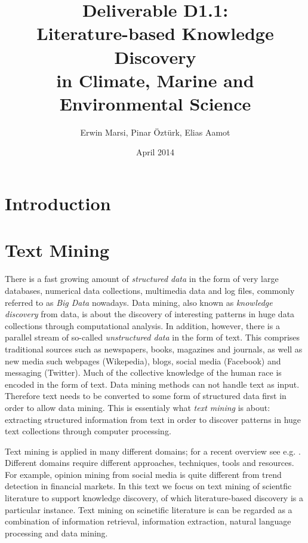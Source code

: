\documentclass[11pt,oneside,a4paper]{report}
\begin{document}
\title{Deliverable D1.1:\\ Literature-based Knowledge Discovery\\in Climate, Marine and Environmental Science}
\author{Erwin Marsi, Pinar \"Ozt\"urk, Elias Aamot}
\date{April 2014}
\maketitle

\abstract{}

\tableofcontents


\chapter{Introduction}


\chapter{Text Mining}


There is a fast growing amount of \emph{structured data} in the form of very large databases, numerical data collections, multimedia data and log files, commonly referred to as \emph{Big Data} nowadays.
Data mining, also known as \emph{knowledge discovery} from data, is about the discovery of interesting patterns in huge data collections through computational analysis.
In addition, however, there is a parallel stream of so-called \emph{unstructured data} in the form of text.
This comprises traditional sources such as newspapers, books, magazines and journals, as well as new media such webpages (Wikepedia), blogs, social media (Facebook) and messaging (Twitter).
Much of the collective knowledge of the human race is encoded in the form of text. 
Data mining methods can not handle text as input.
Therefore text needs to be converted to some form of structured data first in order to allow data mining.
This is essentialy what \emph{text mining} is about: extracting structured information from text in order to discover patterns in huge text collections through computer processing.

Text mining is applied in many different domains; for a recent overview see e.g. \citep{Aggarwal2012Mining,Weiss2012Fundamentals}.
Different domains require different approaches, techniques, tools and resources.
For example, opinion mining from social media is quite different from trend detection in financial markets. 
In this text we focus on text mining of scientfic literature to support knowledge discovery, of which literature-based discovery is a particular instance.
Text mining on scinetific literature is can be regarded as a combination of information retrieval, information extraction, natural language processing and data mining.
\end{document}
